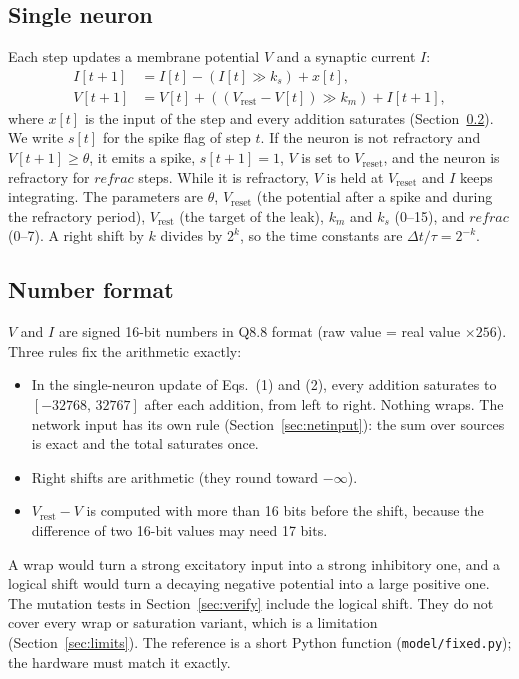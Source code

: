 \documentclass[11pt]{article}
\begin{document}
\subsection{Single neuron}
Each step updates a membrane potential $V$ and a synaptic current $I$:
\begin{align}
I[t+1] &= I[t] - \left(I[t] \gg k_s\right) + x[t], \\
V[t+1] &= V[t] + \left((V_{\mathrm{rest}} - V[t]) \gg k_m\right) + I[t+1],
\end{align}
where $x[t]$ is the input of the step and every addition saturates (Section~\ref{sec:numfmt}).
We write $s[t]$ for the spike flag of step $t$. If the neuron is not refractory and $V[t+1] \ge \theta$, it emits a spike, $s[t+1]=1$, $V$ is set to $V_{\mathrm{reset}}$, and the neuron is refractory for $\mathit{refrac}$ steps.
While it is refractory, $V$ is held at $V_{\mathrm{reset}}$ and $I$ keeps integrating.
The parameters are $\theta$, $V_{\mathrm{reset}}$ (the potential after a spike and during the refractory period), $V_{\mathrm{rest}}$ (the target of the leak), $k_m$ and $k_s$ (0--15), and $\mathit{refrac}$ (0--7).
A right shift by $k$ divides by $2^k$, so the time constants are $\Delta t/\tau = 2^{-k}$.

\subsection{Number format}
\label{sec:numfmt}
$V$ and $I$ are signed 16-bit numbers in Q8.8 format (raw value = real value $\times 256$).
Three rules fix the arithmetic exactly:
\begin{itemize}
\item In the single-neuron update of Eqs.~(1) and (2), every addition saturates to $[-32768,\,32767]$ after each addition, from left to right. Nothing wraps. The network input has its own rule (Section~\ref{sec:netinput}): the sum over sources is exact and the total saturates once.
\item Right shifts are arithmetic (they round toward $-\infty$).
\item $V_{\mathrm{rest}} - V$ is computed with more than 16 bits before the shift, because the difference of two 16-bit values may need 17 bits.
\end{itemize}
A wrap would turn a strong excitatory input into a strong inhibitory one, and a logical shift would turn a decaying negative potential into a large positive one.
The mutation tests in Section~\ref{sec:verify} include the logical shift. They do not cover every wrap or saturation variant, which is a limitation (Section~\ref{sec:limits}).
The reference is a short Python function (\texttt{model/fixed.py}); the hardware must match it exactly.
\end{document}
